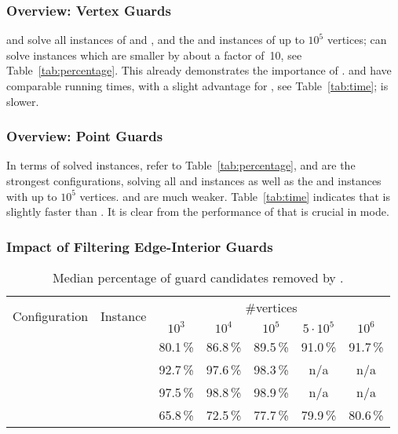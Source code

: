 \subsubsection{Overview: Vertex Guards}
\label{sec:experiments-vertex}

\vdefault and \vnodom solve all instances of \walk and \concavevalleys, and the \sinewalk and \parabolawalk instances of up to $10^5$ vertices;
\vnow can solve instances which are smaller by about a factor of~10, see Table~\ref{tab:percentage}.
This already demonstrates the importance of \witnessfilter.
\vdefault and \vnodom have comparable running times, with a slight advantage for \vdefault, see Table~\ref{tab:time}; \vnow is slower.

\subsubsection{Overview: Point Guards}
\label{sec:experiments-point}

In terms of solved instances, refer to Table~\ref{tab:percentage}, \pdefault and \pnodom are the strongest configurations, solving all \walk and \concavevalleys instances as well as the \sinewalk and \parabolawalk instances with up to $10^5$ vertices.
\pnow and \pnoedge are much weaker.
Table~\ref{tab:time} indicates that \pdefault is slightly faster than \pnodom.
It is clear from the performance of \pnoedge that \pointguardfilter is crucial in \pointguardmode mode.

\subsubsection{Impact of Filtering Edge-Interior Guards}
\label{sec:experiments-edge}

\begin{table}
	\centering
	\small
	\begin{tabular}{|l|l|ccccc|}
		\hline
		\multirow{2}{*}{Configuration} & \multirow{2}{*}{Instance} & \multicolumn{5}{|c|}{\#vertices} \\
		& & $10^3$ & $10^4$ & $10^5$ & $5 \cdot 10^5$ & $10^6$ \\
		\hline
		\hline
		\multirow{4}{*}{\pnodom}
			& \walk           & 80.1\,\% & 86.8\,\% & 89.5\,\% & 91.0\,\% & 91.7\,\% \\
			& \sinewalk       & 92.7\,\% & 97.6\,\% & 98.3\,\% &      n/a &      n/a \\
			& \parabolawalk   & 97.5\,\% & 98.8\,\% & 98.9\,\% &      n/a &      n/a \\
			& \concavevalleys & 65.8\,\% & 72.5\,\% & 77.7\,\% & 79.9\,\% & 80.6\,\% \\
		\hline
	\end{tabular}
	\caption{Median percentage of guard candidates removed by \pointguardfilter.}
	\label{tab:pointguardfilter}
\end{table}

